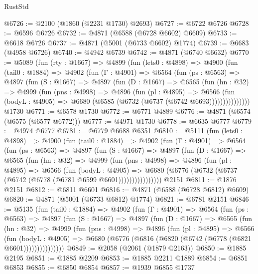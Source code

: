 \begin{lexlean}{RustStd}
\begin{coremodule}
@6726 := @2100 (@1860 (@2231 @1730) @2693)
@6727 := @6722 @6726
@6728 := @6596 @6726
@6732 := @4871 (@6588 (@6728 @6602) @6609)
@6733 := @6618 @6726
@6737 := @4871 (@5001 (@6733 @6602) @1774)
@6739 := @6683 (@4958 @6726)
@6740 := @4942 @6739
@6742 := @4871 (@6740 @6632)
@6770 := @5089
    (fun (rty : @1667) =>
    @4899
      (fun (lets0 : @4898) =>
      @4900
        (fun (tail0 : @1884) =>
        @4902
          (fun (Γ : @4901) =>
          @6564
            (fun (ps : @6563) =>
            @4897
              (fun (S : @1667) =>
              @4897
                (fun (D : @1667) =>
                @6565
                  (fun (hn : @32) =>
                  @4999
                    (fun (pns : @4998) =>
                    @4896
                      (fun (pl : @4895) =>
                      @6566
                        (fun (bodyL : @4905) =>
                        @6680 (@6585 (@6732 (@6737 (@6742 @6693)))))))))))))))
    @1730
@6771 := @6578 @1730
@6772 := @6771 @4889
@6776 := @4871 (@6574 (@6575 (@6577 @6772)))
@6777 := @4971 @1730
@6778 := @6635 @6777
@6779 := @4974 @6777
@6781 := @6779 @6688 @6351
@6810 := @5111
    (fun (lets0 : @4898) =>
    @4900
      (fun (tail0 : @1884) =>
      @4902
        (fun (Γ : @4901) =>
        @6564
          (fun (ps : @6563) =>
          @4897
            (fun (S : @1667) =>
            @4897
              (fun (D : @1667) =>
              @6565
                (fun (hn : @32) =>
                @4999
                  (fun (pns : @4998) =>
                  @4896
                    (fun (pl : @4895) =>
                    @6566
                      (fun (bodyL : @4905) =>
                      @6680 (@6776 (@6732 (@6737 (@6742 (@6778 (@6781 @6599 @6601))))))))))))))))
    @2151
@6811 := @1876 @2151
@6812 := @6811 @6601
@6816 := @4871 (@6588 (@6728 @6812) @6609)
@6820 := @4871 (@5001 (@6733 @6812) @1774)
@6821 := @6781 @2151
@6846 := @5135
    (fun (tail0 : @1884) =>
    @4902
      (fun (Γ : @4901) =>
      @6564
        (fun (ps : @6563) =>
        @4897
          (fun (S : @1667) =>
          @4897
            (fun (D : @1667) =>
            @6565
              (fun (hn : @32) =>
              @4999
                (fun (pns : @4998) =>
                @4896
                  (fun (pl : @4895) =>
                  @6566
                    (fun (bodyL : @4905) =>
                    @6680 (@6776 (@6816 (@6820 (@6742 (@6778 (@6821 @6601)))))))))))))))
@6849 := @2058 (@2061 (@1879 @2163))
@6850 := @1885 @2195
@6851 := @1885 @2209
@6853 := @1885 @2211 @1889
@6854 := @6851 @6853
@6855 := @6850 @6854
@6857 := @1939 @6855 @1737

\end{coremodule}
\end{lexlean}

